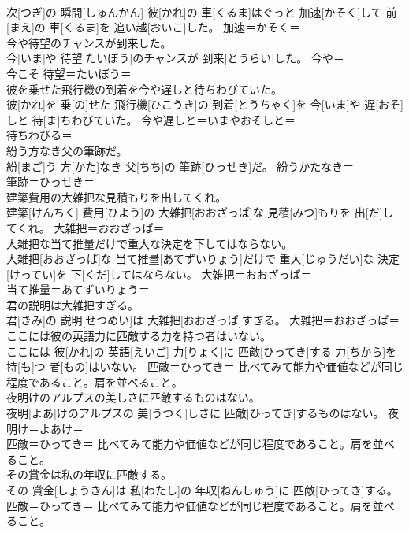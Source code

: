\documentclass[8pt]{extreport}
\begin{document}
\begin{CJK}{UTF8}{min}
\\	次[つぎ]の 瞬間[しゅんかん] 彼[かれ]の 車[くるま]はぐっと 加速[かそく]して 前[まえ]の 車[くるま]を 追い越[おいこ]した。	加速＝かそく＝ 
\\	今や待望のチャンスが到来した。	
\\	今[いま]や 待望[たいぼう]のチャンスが 到来[とうらい]した。	今や＝ 
\\	今こそ 待望＝たいぼう＝ 
\\	彼を乗せた飛行機の到着を今や遅しと待ちわびていた。	
\\	彼[かれ]を 乗[の]せた 飛行機[ひこうき]の 到着[とうちゃく]を 今[いま]や 遅[おそ]しと 待[ま]ちわびていた。	今や遅しと＝いまやおそしと＝ 
\\	待ちわびる＝ 
\\	紛う方なき父の筆跡だ。	
\\	紛[まご]う 方[かた]なき 父[ちち]の 筆跡[ひっせき]だ。	紛うかたなき＝ 
\\	筆跡＝ひっせき＝ 
\\	建築費用の大雑把な見積もりを出してくれ。	
\\	建築[けんちく] 費用[ひよう]の 大雑把[おおざっぱ]な 見積[みつ]もりを 出[だ]してくれ。	大雑把＝おおざっぱ＝ 
\\	大雑把な当て推量だけで重大な決定を下してはならない。	
\\	大雑把[おおざっぱ]な 当て推量[あてずいりょう]だけで 重大[じゅうだい]な 決定[けってい]を 下[くだ]してはならない。	大雑把＝おおざっぱ＝ 
\\	当て推量＝あてずいりょう＝ 
\\	君の説明は大雑把すぎる。	
\\	君[きみ]の 説明[せつめい]は 大雑把[おおざっぱ]すぎる。	大雑把＝おおざっぱ＝ 
\\	ここには彼の英語力に匹敵する力を持つ者はいない。	
\\	ここには 彼[かれ]の 英語[えいご] 力[りょく]に 匹敵[ひってき]する 力[ちから]を 持[も]つ 者[もの]はいない。	匹敵＝ひってき＝ 比べてみて能力や価値などが同じ程度であること。肩を並べること。
\\	夜明けのアルプスの美しさに匹敵するものはない。	
\\	夜明[よあ]けのアルプスの 美[うつく]しさに 匹敵[ひってき]するものはない。	夜明け＝よあけ＝ 
\\	匹敵＝ひってき＝ 比べてみて能力や価値などが同じ程度であること。肩を並べること。
\\	その賞金は私の年収に匹敵する。	
\\	その 賞金[しょうきん]は 私[わたし]の 年収[ねんしゅう]に 匹敵[ひってき]する。	匹敵＝ひってき＝ 比べてみて能力や価値などが同じ程度であること。肩を並べること。

\end{CJK}
\end{document}
